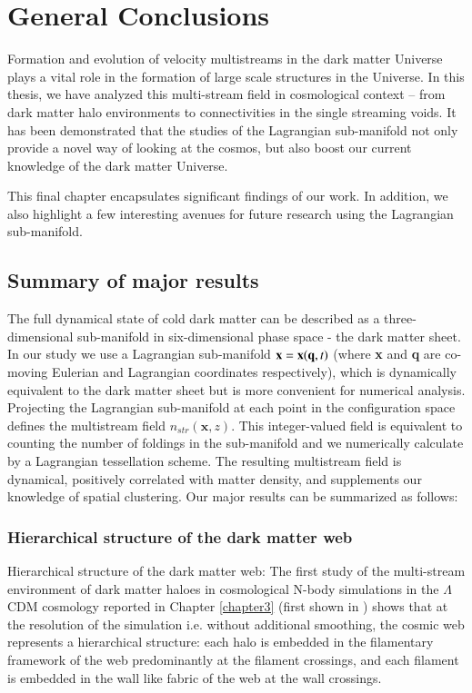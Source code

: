 
\chapter{General Conclusions}\label{chapter6}

Formation and evolution of velocity multistreams in the dark matter Universe plays a vital role in the formation of large scale structures in the Universe. In this thesis, we have analyzed this multi-stream field in cosmological context -- from dark matter halo environments to connectivities in the single streaming voids. It has been demonstrated that the studies of the Lagrangian sub-manifold not only provide a novel way of looking at the cosmos, but also boost our current knowledge of the dark matter Universe. 

This final chapter encapsulates significant findings of our work. In addition, we also highlight a few interesting avenues for future research using the Lagrangian sub-manifold.      

\section{Summary of major results}

The full dynamical state of cold dark matter can be described as a three-dimensional sub-manifold
in six-dimensional phase space - the dark matter sheet. In our study we use a Lagrangian sub-manifold ${\bf x} = {\bf x}({\bf q},t)$ 
(where {\bf x} and {\bf q} are co-moving Eulerian and Lagrangian coordinates respectively), which 
is dynamically  equivalent to the dark matter sheet but is more convenient for numerical analysis. Projecting the Lagrangian sub-manifold at each point in the configuration space defines the multistream field  $n_{str}(\mathbf{x}, z)$. This integer-valued field is equivalent to counting the number of foldings in the sub-manifold and we numerically calculate by a Lagrangian tessellation scheme. The resulting multistream field is dynamical, positively correlated with matter density, and supplements our knowledge of spatial clustering. Our major results can be summarized as follows:

\subsection{Hierarchical structure of the dark matter web}
Hierarchical structure of the dark matter web: The first study of the multi-stream environment of dark matter haloes in cosmological N-body simulations in the $\Lambda$CDM cosmology reported in Chapter \ref{chapter3} (first shown in \cite{Ramachandra2015}) shows that at the resolution of the simulation i.e. without additional smoothing, the cosmic web represents a hierarchical structure: each halo is embedded in the filamentary framework of the web predominantly  at the filament crossings, and each filament is embedded in the wall like fabric of the web at the wall crossings. 

